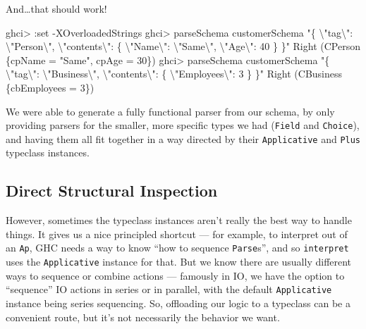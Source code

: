 \documentclass[]{article}
\newenvironment{Shaded}{}{}
\newcommand{\DataTypeTok}[1]{\textcolor[rgb]{0.56,0.13,0.00}{#1}}
\newcommand{\DecValTok}[1]{\textcolor[rgb]{0.25,0.63,0.44}{#1}}
\newcommand{\NormalTok}[1]{#1}
\newcommand{\OperatorTok}[1]{\textcolor[rgb]{0.40,0.40,0.40}{#1}}
\newcommand{\OtherTok}[1]{\textcolor[rgb]{0.00,0.44,0.13}{#1}}
\newcommand{\StringTok}[1]{\textcolor[rgb]{0.25,0.44,0.63}{#1}}
\begin{document}
And\ldots that should work!

\begin{Shaded}
\begin{Highlighting}[]
\NormalTok{ghci}\OperatorTok{>} \OperatorTok{:}\NormalTok{set }\OperatorTok{{-}}\DataTypeTok{XOverloadedStrings}
\NormalTok{ghci}\OperatorTok{>}\NormalTok{ parseSchema customerSchema  }\StringTok{"\{ \textbackslash{}"tag\textbackslash{}": \textbackslash{}"Person\textbackslash{}", \textbackslash{}"contents\textbackslash{}": \{ \textbackslash{}"Name\textbackslash{}": \textbackslash{}"Same\textbackslash{}", \textbackslash{}"Age\textbackslash{}": 40 \} \}"}
\DataTypeTok{Right}\NormalTok{ (}\DataTypeTok{CPerson}\NormalTok{ \{cpName }\OtherTok{=} \StringTok{"Same"}\NormalTok{, cpAge }\OtherTok{=} \DecValTok{30}\NormalTok{\})}
\NormalTok{ghci}\OperatorTok{>}\NormalTok{ parseSchema customerSchema  }\StringTok{"\{ \textbackslash{}"tag\textbackslash{}": \textbackslash{}"Business\textbackslash{}", \textbackslash{}"contents\textbackslash{}": \{ \textbackslash{}"Employees\textbackslash{}": 3 \} \}"}
\DataTypeTok{Right}\NormalTok{ (}\DataTypeTok{CBusiness}\NormalTok{ \{cbEmployees }\OtherTok{=} \DecValTok{3}\NormalTok{\})}
\end{Highlighting}
\end{Shaded}

We were able to generate a fully functional parser from our schema, by only
providing parsers for the smaller, more specific types we had (\texttt{Field}
and \texttt{Choice}), and having them all fit together in a way directed by
their \texttt{Applicative} and \texttt{Plus} typeclass instances.

\hypertarget{direct-structural-inspection}{%
\subsection{Direct Structural Inspection}\label{direct-structural-inspection}}

However, sometimes the typeclass instances aren't really the best way to handle
things. It gives us a nice principled shortcut --- for example, to interpret out
of an \texttt{Ap}, GHC needs a way to know ``how to sequence \texttt{Parse}s'',
and so \texttt{interpret} uses the \texttt{Applicative} instance for that. But
we know there are usually different ways to sequence or combine actions ---
famously in IO, we have the option to ``sequence'' IO actions in series or in
parallel, with the default \texttt{Applicative} instance being series
sequencing. So, offloading our logic to a typeclass can be a convenient route,
but it's not necessarily the behavior we want.
\end{document}
